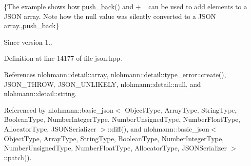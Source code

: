 \{The example shows how {\ttfamily \hyperlink{classnlohmann_1_1basic__json_ac8e523ddc8c2dd7e5d2daf0d49a9c0d7}{push\+\_\+back()}} and {\ttfamily +=} can be used to add elements to a J\+S\+ON array. Note how the {\ttfamily null} value was silently converted to a J\+S\+ON array.,push\+\_\+back\}

\begin{DoxySince}{Since}
version 1.. 
\end{DoxySince}


Definition at line 14177 of file json.\+hpp.



References nlohmann\+::detail\+::array, nlohmann\+::detail\+::type\+\_\+error\+::create(), J\+S\+O\+N\+\_\+\+T\+H\+R\+OW, J\+S\+O\+N\+\_\+\+U\+N\+L\+I\+K\+E\+LY, nlohmann\+::detail\+::null, and nlohmann\+::detail\+::string.



Referenced by nlohmann\+::basic\+\_\+json$<$ Object\+Type, Array\+Type, String\+Type, Boolean\+Type, Number\+Integer\+Type, Number\+Unsigned\+Type, Number\+Float\+Type, Allocator\+Type, J\+S\+O\+N\+Serializer $>$\+::diff(), and nlohmann\+::basic\+\_\+json$<$ Object\+Type, Array\+Type, String\+Type, Boolean\+Type, Number\+Integer\+Type, Number\+Unsigned\+Type, Number\+Float\+Type, Allocator\+Type, J\+S\+O\+N\+Serializer $>$\+::patch().


